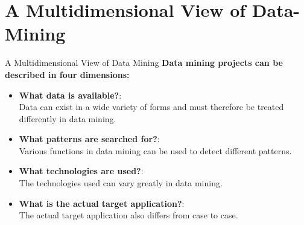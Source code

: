 \section{A Multidimensional View of Data-Mining}

\begin{frame}{A Multidimensional View of Data Mining}
	\textbf{Data mining projects can be described in four dimensions:}
	\begin{itemize}
		\item \textbf{What data is available?}:\\
		      \small{
			      Data can exist in a wide variety of forms and must therefore be
			      treated differently in data mining.
		      }
		\item \textbf{What patterns are searched for?}:\\
		      \small{
			      Various functions in data mining can be used to detect
			      different patterns.
		      }
		\item \textbf{What technologies are used?}:\\
		      \small{
			      The technologies used can vary greatly in data mining.
		      }
		\item \textbf{What is the actual target application?}:\\
		      \small{
			      The actual target application also differs from case to case.
		      }
	\end{itemize}
\end{frame}
